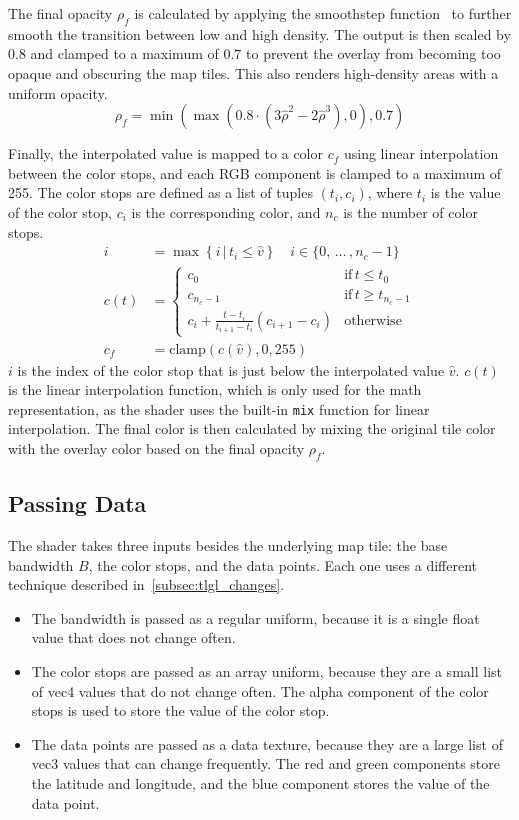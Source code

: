The final opacity $\rho_{f}$ is calculated by applying the smoothstep function\ \cite{quilez:smoothstep} to further smooth the transition between low and high density. The output is then scaled by $0.8$ and clamped to a maximum of $0.7$ to prevent the overlay from becoming too opaque and obscuring the map tiles. This also renders high-density areas with a uniform opacity.
\[
\rho_{f} = \min\left(\max\left(0.8\cdot\left(3\hat{\rho}^2-2\hat{\rho}^3\right),0\right),0.7\right)
\]

Finally, the interpolated value is mapped to a color $c_f$ using linear interpolation between the color stops, and each RGB component is clamped to a maximum of 255. The color stops are defined as a list of tuples $(t_{i}, c_{i})$, where $t_{i}$ is the value of the color stop, $c_{i}$ is the corresponding color, and $n_c$ is the number of color stops.
\[
\begin{aligned}
i &= \max\left\{i \,|\,t_{i}\leq \hat{v}\right\}\quad i \in \{0,\,\dots\, ,n_{c}-1\}\\
c(t) &= \begin{cases}
c_{0} & \text{if} \, t\leq t_{0} \\
c_{n_c-1} & \text{if}\, t\geq t_{n_c-1} \\
c_{i}+\frac{t-t_{i}}{t_{i+1}-t_{i}}(c_{i+1}-c_{i}) & \mathrm{otherwise}
\end{cases}\\
c_{f} &= \mathrm{clamp}(c(\hat{v}), 0, 255)
\end{aligned}
\]
$i$ is the index of the color stop that is just below the interpolated value $\hat{v}$. $c(t)$ is the linear interpolation function, which is only used for the math representation, as the shader uses the built-in \verb|mix| function for linear interpolation. The final color is then calculated by mixing the original tile color with the overlay color based on the final opacity $\rho_{f}$\@.

\subsection{Passing Data}

The shader takes three inputs besides the underlying map tile: the base bandwidth $B$, the color stops, and the data points. Each one uses a different technique described in\ \autoref{subsec:tlgl_changes}.

\begin{itemize}
    \item The bandwidth is passed as a regular uniform, because it is a single float value that does not change often.
    \item The color stops are passed as an array uniform, because they are a small list of vec4 values that do not change often. The alpha component of the color stops is used to store the value of the color stop.
    \item The data points are passed as a data texture, because they are a large list of vec3 values that can change frequently. The red and green components store the latitude and longitude, and the blue component stores the value of the data point.
\end{itemize}

